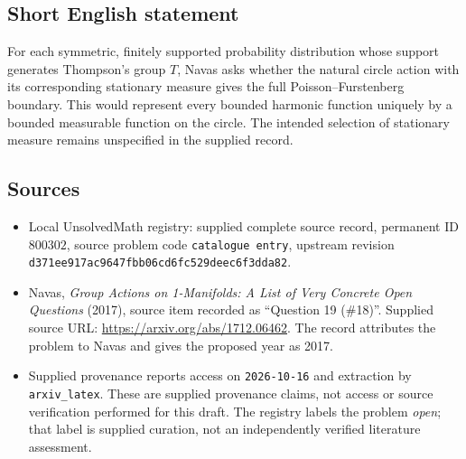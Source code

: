 \documentclass[11pt]{article}
\begin{document}
\subsection{Short English statement}
For each symmetric, finitely supported probability distribution whose support generates Thompson's group \(T\), Navas asks whether the natural circle action with its corresponding stationary measure gives the full Poisson--Furstenberg boundary. This would represent every bounded harmonic function uniquely by a bounded measurable function on the circle. The intended selection of stationary measure remains unspecified in the supplied record.
\subsection{Sources}
\begin{itemize}
\item Local UnsolvedMath registry: supplied complete source record, permanent ID \(800302\), source problem code \texttt{catalogue entry}, upstream revision \texttt{d371ee917ac9647fbb06cd6fc529deec6f3dda82}.
\item Navas, \emph{Group Actions on 1-Manifolds: A List of Very Concrete Open Questions} (2017), source item recorded as ``Question 19 (\#18)''. Supplied source URL: \url{https://arxiv.org/abs/1712.06462}. The record attributes the problem to Navas and gives the proposed year as 2017.
\item Supplied provenance reports access on \texttt{2026-10-16} and extraction by \texttt{arxiv\_latex}. These are supplied provenance claims, not access or source verification performed for this draft. The registry labels the problem \emph{open}; that label is supplied curation, not an independently verified literature assessment.
\end{itemize}
\end{document}
